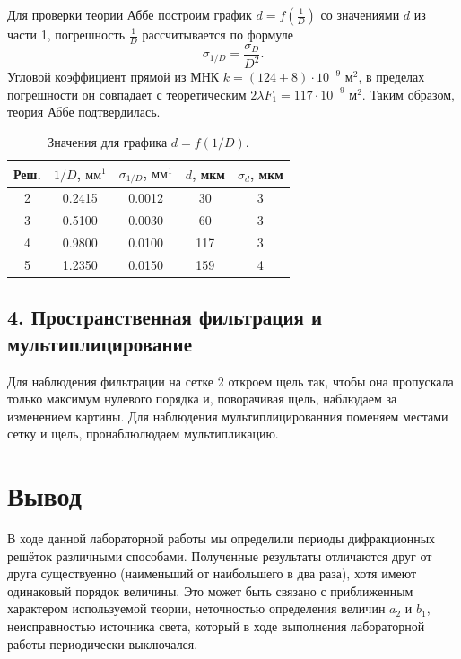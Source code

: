 \documentclass[a4paper, 12pt]{article}%
\begin{document}
Для проверки теории Аббе построим график $d = f(\frac{1}{D})$ со значениями $d$ из части 1, погрешность $\frac{1}{D}$ рассчитывается по формуле
$$
\sigma_{1/D} = \dfrac{\sigma_D}{D^2}.
$$
Угловой коэффициент прямой из МНК $k = (124 \pm 8) \cdot 10^{-9} \text{ м}^2$, в пределах погрешности он совпадает с теоретическим $2\lambda F_1 = 117 \cdot 10^{-9} \text{ м}^2$. Таким образом, теория Аббе подтвердилась.
\begin{table}[h]
\begin{tabular}{|c|c|c|c|c|}
\hline
Реш. & $1/D$, $\text{мм}^1$ & $\sigma_{1/D}$, $\text{мм}^1$ & $d$, мкм & $\sigma_d$, мкм \\ \hline
2    & 0.2415               & 0.0012                        & 30       & 3               \\ \hline
3    & 0.5100                & 0.0030                         & 60       & 3               \\ \hline
4    & 0.9800                & 0.0100                         & 117      & 3               \\ \hline
5    & 1.2350                & 0.0150                         & 159      & 4               \\ \hline
\end{tabular}
\centering
\caption{Значения для графика $d = f(1/D)$.}
\end{table}

\textbf{       }

\subsection*{4. Пространственная фильтрация и мультиплицирование}
Для наблюдения фильтрации на сетке 2 откроем щель так, чтобы она пропускала только максимум нулевого порядка и, поворачивая щель, наблюдаем за изменением картины.
Для наблюдения мультиплицированния поменяем местами сетку и щель, пронаблюлюдаем мультипликацию.
\textbf{       }

\section*{Вывод}
	В ходе данной лабораторной работы мы определили периоды дифракционных решёток различными способами. Полученные результаты отличаются друг от друга существуенно (наименьший от наибольшего в два раза), хотя имеют одинаковый порядок величины. Это может быть связано с приближенным характером используемой теории, неточностью определения величин $a_2$ и $b_1$, неисправностью источника света, который в ходе выполнения лабораторной работы периодически выключался. 
	
\end{document}
